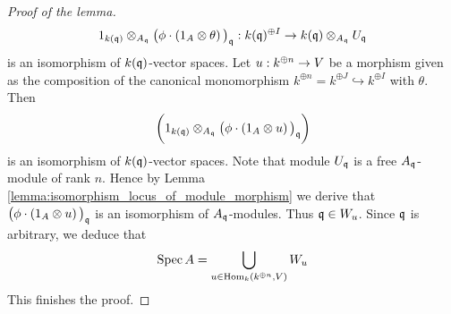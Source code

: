 \begin{proof}[Proof of the lemma]
$$1_{k(\mathfrak{q})}\otimes_{A_{\mathfrak{q}}}\big(\phi\cdot \left(1_A\otimes \theta\right)\big)_{\mathfrak{q}}:k(\mathfrak{q})^{\oplus I}\rightarrow k(\mathfrak{q})\otimes_{A_{\mathfrak{q}}}U_{\mathfrak{q}}$$
is an isomorphism of $k(\mathfrak{q})$-vector spaces. Let $u:k^{\oplus n}\rightarrow V$ be a morphism given as the composition of the canonical monomorphism $k^{\oplus n} = k^{\oplus J}\hookrightarrow k^{\oplus I}$ with $\theta$. Then
$$\bigg(1_{k(\mathfrak{q})}\otimes_{A_{\mathfrak{q}}}\big(\phi\cdot \left(1_A\otimes u\right)\big)_{\mathfrak{q}}\bigg)$$
is an isomorphism of $k(\mathfrak{q})$-vector spaces. Note that module $U_{\mathfrak{q}}$ is a free $A_{\mathfrak{q}}$-module of rank $n$. Hence by Lemma \ref{lemma:isomorphism_locus_of_module_morphism} we derive that $\big(\phi\cdot \left(1_A\otimes u\right)\big)_{\mathfrak{q}}$ is an isomorphism of $A_{\mathfrak{q}}$-modules. Thus $\mathfrak{q} \in W_u$. Since $\mathfrak{q}$ is arbitrary, we deduce that
$$\mathrm{Spec}\, A = \bigcup_{u\in \mathrm{Hom}_{k}(k^{\oplus n},V)}W_u$$
This finishes the proof.
\end{proof}

